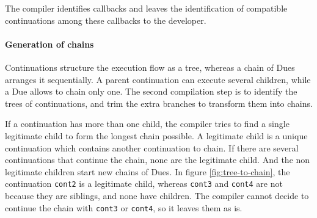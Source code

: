 The compiler identifies callbacks and leaves the identification of compatible continuations among these callbacks to the developer.




\paragraph{Generation of chains}

Continuations structure the execution flow as a tree, whereas a chain of Dues arranges it sequentially.
A parent continuation can execute several children, while a Due allows to chain only one.
The second compilation step is to identify the trees of continuations, and trim the extra branches to transform them into chains.

If a continuation has more than one child, the compiler tries to find a single legitimate child to form the longest chain possible.
A legitimate child is a unique continuation which contains another continuation to chain.
If there are several continuations that continue the chain, none are the legitimate child.
And the non legitimate children start new chains of Dues.
In figure \ref{fig:tree-to-chain}, the continuation \texttt{cont2} is a legitimate child, whereas \texttt{cont3} and \texttt{cont4} are not because they are siblings, and none have children.
The compiler cannot decide to continue the chain with \texttt{cont3} or \texttt{cont4}, so it leaves them as is.

